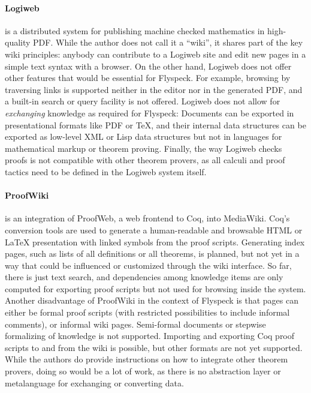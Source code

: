 \paragraph{Logiweb} is a distributed system for publishing machine checked mathematics in
high-quality PDF\cite{Grue:Logiweb07}.  While the author does not call
it a ``wiki'', it shares part of the key wiki principles: anybody can
contribute to a Logiweb site and edit new pages in a simple text
syntax with a browser.  On the other hand, Logiweb does not offer
other features that would be essential for Flyspeck.  For example,
browsing by traversing links is supported neither in the editor nor in
the generated PDF, and a built-in search or query facility is not
offered.  Logiweb does not allow for \emph{exchanging} knowledge as
required for Flyspeck: Documents can be exported in presentational
formats like PDF or \TeX{}, and their internal data structures can be
exported as low-level XML or Lisp data structures but not in languages
for mathematical markup or theorem proving.  Finally, the way Logiweb
checks proofs is not compatible with other theorem provers, as all
calculi and proof tactics need to be defined in the Logiweb system
itself.

\paragraph{ProofWiki} is an integration of ProofWeb, a web frontend to Coq, into
MediaWiki\cite{CorKal:CoopReposFormalProofs07}.  Coq's conversion
tools are used to generate a human-readable and browsable HTML or
{\LaTeX} presentation with linked symbols from the proof scripts.
Generating index pages, such as lists of all definitions or all
theorems, is planned, but not yet in a way that could be influenced or
customized through the wiki interface.  So far, there is just text
search, and dependencies among knowledge items are only computed for
exporting proof scripts but not used for browsing inside the system.
Another disadvantage of ProofWiki in the context of Flyspeck is that
pages can either be formal proof scripts (with restricted
possibilities to include informal comments), or informal wiki pages.
Semi-formal documents or stepwise formalizing of knowledge is not
supported.  Importing and exporting Coq proof scripts to and from the
wiki is possible, but other formats are not yet supported.  While the
authors do provide instructions on how to integrate other theorem
provers, doing so would be a lot of work, as there is no abstraction
layer or metalanguage for exchanging or converting data.

